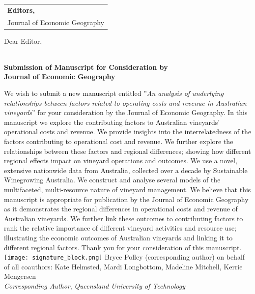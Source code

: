 \documentclass{article}
\begin{document}
\begin{tabular}{@{} l}
	\textbf{Editors,}\\
	Journal of Economic Geography\\
\end{tabular}

\bigskip %

Dear Editor,
\\~\\
\parskip %

\centering \textbf{Submission of Manuscript for Consideration by \\Journal of Economic Geography}\\
\bigskip %
\justifying
\noindent

\bigskip \noindent%
We wish to submit a new manuscript entitled  ''\textit{An analysis of underlying relationships between factors related to operating costs and revenue in Australian vineyards}'' for your consideration by the Journal of Economic Geography.
\newline \noindent
In this manuscript we explore the contributing factors to Australian vineyards' operational costs and revenue. We provide insights into the interrelatedness of the factors contributing to operational cost and revenue. We further explore the relationships between these factors and regional differences; showing how different regional effects impact on vineyard operations and outcomes. We use a novel, extensive nationwide data from Australia, collected over a decade by Sustainable Winegrowing Australia. We construct and analyse several models of the multifaceted, multi-resource nature of vineyard management.
\newline \noindent
We believe that this manuscript is appropriate for publication by the Journal of Economic  Geography as it demonstrates the regional differences in operational costs and revenue of Australian vineyards. We further link these outcomes to contributing factors to rank the relative importance of different vineyard activities and resource use; illustrating the economic outcomes of Australian vineyards and linking it to different regional factors. Thank you for your consideration of this manuscript.
\bigskip 
\newline \noindent%
\texttt{[image: signature\_block.png]}
\newline \noindent
Bryce Polley (corresponding author) on behalf of all coauthors: Kate Helmsted, Mardi Longbottom, Madeline Mitchell, Kerrie Mengersen\\
\newline \noindent
\textit{Corresponding Author}, \textit{Queensland University of Technology}
\end{document}
